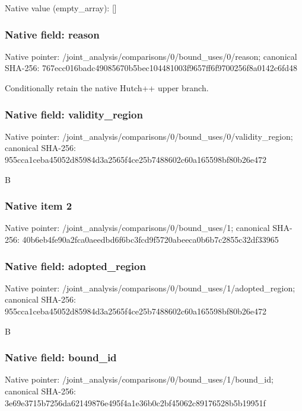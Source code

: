 \documentclass[10pt,a4paper]{article}
\begin{document}
Native value (empty\_\allowbreak{}array): []

\subsubsection{Native field: reason}
Native pointer: /joint\_\allowbreak{}analysis/comparisons/0/bound\_\allowbreak{}uses/0/reason; canonical SHA-256: 767ecc016badc49085670b5bec104481003f9657ff6f9700256f8a0142c6fd48

\begingroup\raggedright\sloppy Conditionally retain the native Hutch++ upper branch.\par\endgroup

\subsubsection{Native field: validity\_\allowbreak{}region}
Native pointer: /joint\_\allowbreak{}analysis/comparisons/0/bound\_\allowbreak{}uses/0/validity\_\allowbreak{}region; canonical SHA-256: 955cca1ceba45052d85984d3a2565f4ce25b7488602c60a165598bf80b26e472

\begingroup\raggedright\sloppy B\par\endgroup

\subsubsection{Native item 2}
Native pointer: /joint\_\allowbreak{}analysis/comparisons/0/bound\_\allowbreak{}uses/1; canonical SHA-256: 40b6eb4fe90a2fca0aeedbd6f6bc3fcd9f5720abeeca0b6b7c2855c32df33965

\subsubsection{Native field: adopted\_\allowbreak{}region}
Native pointer: /joint\_\allowbreak{}analysis/comparisons/0/bound\_\allowbreak{}uses/1/adopted\_\allowbreak{}region; canonical SHA-256: 955cca1ceba45052d85984d3a2565f4ce25b7488602c60a165598bf80b26e472

\begingroup\raggedright\sloppy B\par\endgroup

\subsubsection{Native field: bound\_\allowbreak{}id}
Native pointer: /joint\_\allowbreak{}analysis/comparisons/0/bound\_\allowbreak{}uses/1/bound\_\allowbreak{}id; canonical SHA-256: 3e69e3715b7256da62149876e495f4a1e36b0c2bf45062c89176528b5b19951f
\end{document}
